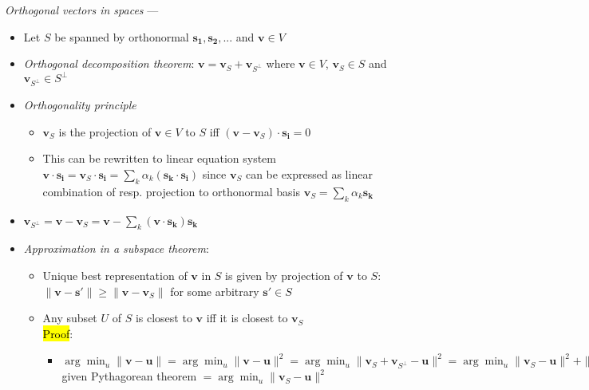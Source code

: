 \emph{Orthogonal vectors in spaces} --- 
\begin{itemize}
    \item Let $S$ be spanned by orthonormal $\boldsymbol{s_1},\boldsymbol{s_2},...$ and $\boldsymbol{v} \in V$
    \item \emph{Orthogonal decomposition theorem}: $\boldsymbol{v} = \boldsymbol{v}_{S} + \boldsymbol{v}_{S^\bot}$ where $\boldsymbol{v} \in V$, $\boldsymbol{v}_{S} \in S$ and $\boldsymbol{v}_{S^\bot} \in S^\bot$
    \item \emph{Orthogonality principle}
    \begin{itemize}
        \item $\boldsymbol{v}_{S}$ is the projection of $\boldsymbol{v} \in V$ to $S$ iff $(\boldsymbol{v}-\boldsymbol{v}_{S}) \cdot \boldsymbol{s_i} = 0$
        \item This can be rewritten to linear equation system $\boldsymbol{v} \cdot \boldsymbol{s_i} = \boldsymbol{v}_{S} \cdot \boldsymbol{s_i} = \sum_k \alpha_k (\boldsymbol{s_k} \cdot \boldsymbol{s_i})$ since $\boldsymbol{v}_{S}$ can be expressed as linear combination of resp. projection to orthonormal basis $\boldsymbol{v}_{S} = \sum_k \alpha_k \boldsymbol{s_k}$
    \end{itemize}
    \item $\boldsymbol{v}_{S^\bot} = \boldsymbol{v} - \boldsymbol{v}_{S} = \boldsymbol{v} - \sum_k (\boldsymbol{v} \cdot \boldsymbol{s_k}) \boldsymbol{s_k}$ 
    \item \emph{Approximation in a subspace theorem}: 
    \begin{itemize}
        \item Unique best representation of $\boldsymbol{v}$ in $S$ is given by projection of $\boldsymbol{v}$ to $S$: $\|\boldsymbol{v} - \boldsymbol{s'}\| \geq \|\boldsymbol{v} - \boldsymbol{v}_S\|$ for some arbitrary $\boldsymbol{s'} \in S$
        \item Any subset $U$ of $S$ is closest to $\boldsymbol{v}$  iff it is closest to $\boldsymbol{v}_S$\\
        \hl{Proof}:
        \begin{itemize}
            \item $\arg\min_u \| \boldsymbol{v} - \boldsymbol{u} \| = \arg\min_u \| \boldsymbol{v} - \boldsymbol{u} \|^2 = \arg\min_u \| \boldsymbol{v}_S + \boldsymbol{v}_{S^\bot} - \boldsymbol{u} \|^2 = \arg\min_u \| \boldsymbol{v}_S - \boldsymbol{u}\|^2 + \|\boldsymbol{v}_{S^\bot}\|^2$ given Pythagorean theorem $ = \arg\min_u \| \boldsymbol{v}_S - \boldsymbol{u}\|^2$

\end{itemize}
\end{itemize}
\end{itemize}
